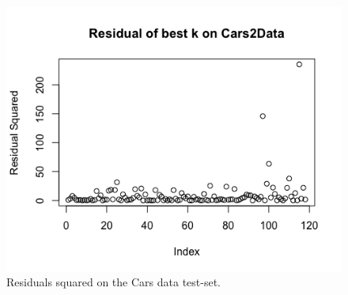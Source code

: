\documentclass{paper}
\begin{document}
\begin{figure}[h]
\begin{center}
\includegraphics[width=0.8\linewidth]{cars}
\end{center}
\caption{Residuals squared on the Cars data test-set. }
\label{fig:cars}
\end{figure}
\end{document}

